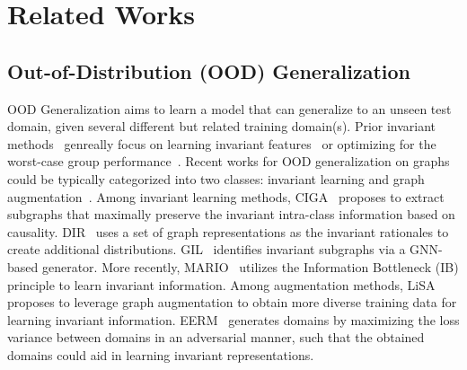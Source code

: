 \section{Related Works}
\subsection{Out-of-Distribution (OOD) Generalization} OOD Generalization aims to learn a model that can generalize to an unseen test domain, given several different but related training domain(s). Prior invariant methods~\citep{ganin2015unsupervised,li2018domain,arjovsky2019invariant} genreally focus on learning invariant features~\citep{sun2016return,peng2019moment} or optimizing for the worst-case group performance~\citep{hu2018does,sagawa2020distributionally}. 
  Recent works for OOD generalization on graphs~\citep{chen2022learning,li2022learning,wang2024safety} could be typically categorized into two classes: invariant learning and graph augmentation~\citep{li2022out}. Among invariant learning methods, CIGA~\citep{chen2022learning} proposes to extract subgraphs that maximally preserve the invariant intra-class information based on causality. 
  DIR~\citep{wudiscovering} uses a set of graph representations as the invariant rationales 
  to create additional distributions. GIL~\citep{li2022learning} identifies invariant subgraphs via a GNN-based generator.
  More recently, 
  MARIO~\citep{zhu2023mario} utilizes the Information Bottleneck (IB) principle to learn invariant information. 
 Among augmentation methods, LiSA~\citep{yu2023mind} proposes to leverage graph augmentation to obtain more diverse training data for learning invariant information. 
 EERM~\citep{wuhandling} generates domains by maximizing the loss variance between domains in an adversarial manner, such that the obtained domains could aid in learning invariant representations. 

